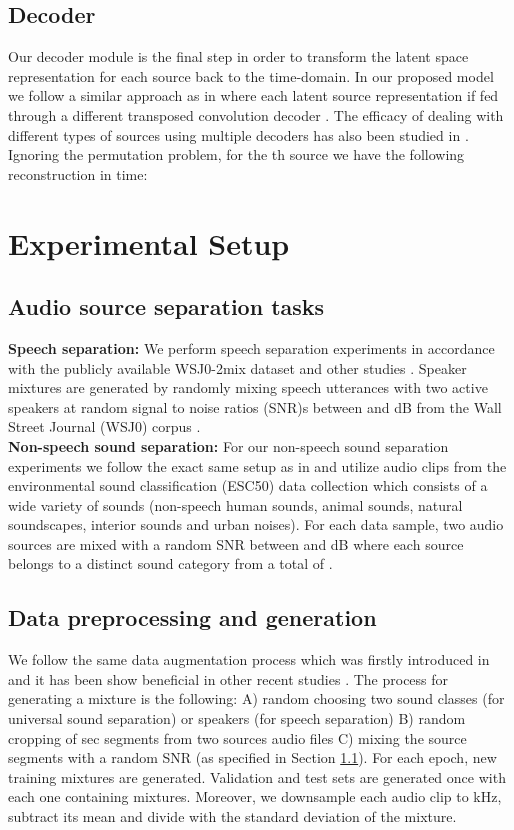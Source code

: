 \documentclass{article}
\theoremstyle{definition}
\begin{document}
\subsection{Decoder}
\label{sec:net_arch:decoder}
Our decoder module  is the final step in order to transform the latent space representation  for each source back to the time-domain. In our proposed model we follow a similar approach as in \cite{tzinis2019two} where each latent source representation  if fed through a different transposed convolution decoder . The efficacy of dealing with different types of sources using multiple decoders has also been studied in \cite{differentdecoders}. Ignoring the permutation problem, for the th source we have the following reconstruction in time: 

\section{Experimental Setup}
\label{sec:exp_setup}
\subsection{Audio source separation tasks}
\label{sec:exp_setup:datasets}
\noindent\textbf{Speech separation:} We perform speech separation experiments in accordance with the publicly available WSJ0-2mix dataset \cite{hershey2016deepclustering} and other studies \cite{luo2019dual, zeghidour2020wavesplit, liu2019DeepCASA}. Speaker mixtures are generated by randomly mixing speech utterances with two active speakers at random signal to noise ratios (SNR)s between  and dB from the Wall Street Journal (WSJ0) corpus \cite{WSJ0}.\\ 
\noindent\textbf{Non-speech sound separation:} For our non-speech sound separation experiments we follow the exact same setup as in \cite{tzinis2019two} and utilize audio clips from the environmental sound classification (ESC50) data collection \cite{esc50} which consists of a wide variety of sounds (non-speech human sounds, animal sounds, natural soundscapes, interior sounds and urban noises). For each data sample, two audio sources are mixed with a random SNR between  and dB where each source belongs to a distinct sound category from a total of . 
\subsection{Data preprocessing and generation}
We follow the same data augmentation process which was firstly introduced in \cite{tzinis2019two} and it has been show beneficial in other recent studies \cite{zeghidour2020wavesplit}. The process for generating a mixture is the following: A) random choosing two sound classes (for universal sound separation) or speakers (for speech separation) B) random cropping of sec segments from two sources audio files C) mixing the source segments with a random SNR (as specified in Section \ref{sec:exp_setup:datasets}). For each epoch,  new training mixtures are generated. Validation and test sets are generated once with each one containing  mixtures. Moreover, we downsample each audio clip to kHz, subtract its mean and divide with the standard deviation of the mixture. 
\end{document}
